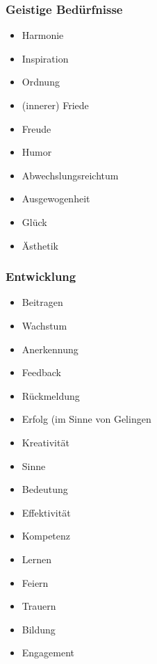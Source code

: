 \subsubsection{Geistige Bedürfnisse}

\begin{multicols}{2}
  \begin{itemize}
    \item Harmonie
    \item Inspiration
    \item \glqq Ordnung \grqq
    \item (innerer) Friede
    \item Freude
    \item Humor
    \item Abwechslungsreichtum
    \item Ausgewogenheit
    \item Glück
    \item Ästhetik
  \end{itemize}
\end{multicols}


\subsubsection{Entwicklung}

\begin{multicols}{2}
  \begin{itemize}
    \item Beitragen
    \item Wachstum
    \item Anerkennung
    \item Feedback
    \item Rückmeldung
    \item Erfolg (im Sinne von \glqq Gelingen\grqq
    \item Kreativität
    \item Sinne
    \item Bedeutung
    \item Effektivität
    \item Kompetenz
    \item Lernen
    \item Feiern
    \item Trauern
    \item Bildung
    \item Engagement
  \end{itemize}
\end{multicols}
